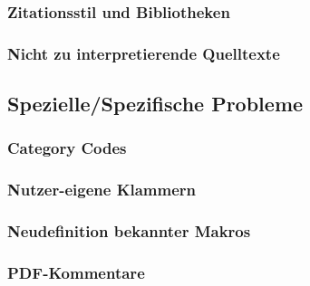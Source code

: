 \subsubsection{Zitationsstil und Bibliotheken}%
\subsubsection{Nicht zu interpretierende Quelltexte}%




\subsection{Spezielle/Spezifische Probleme}

\subsubsection{Category Codes}
\subsubsection{Nutzer-eigene Klammern}
\subsubsection{Neudefinition bekannter Makros}%
\subsubsection{PDF-Kommentare}%

